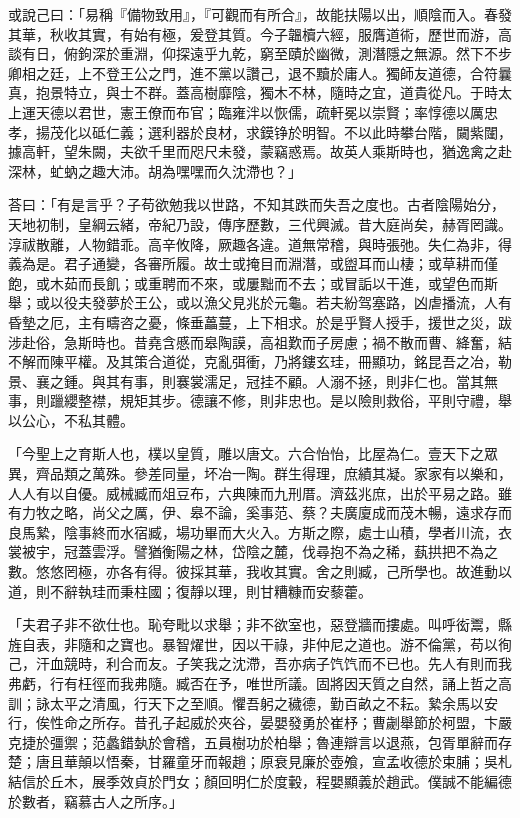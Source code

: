 \begin{pinyinscope}
或說己曰：「易稱『備物致用』，『可觀而有所合』，故能扶陽以出，順陰而入。春發其華，秋收其實，有始有極，爰登其質。今子韞櫝六經，服膺道術，歷世而游，高談有日，俯鉤深於重淵，仰探遠乎九乾，窮至賾於幽微，測潛隱之無源。然下不步卿相之廷，上不登王公之門，進不黨以讚己，退不黷於庸人。獨師友道德，合符曩真，抱景特立，與士不群。蓋高樹靡陰，獨木不林，隨時之宜，道貴從凡。于時太上運天德以君世，憲王僚而布官；臨雍泮以恢儒，疏軒冕以崇賢；率惇德以厲忠孝，揚茂化以砥仁義；選利器於良材，求鏌铮於明智。不以此時攀台階，闚紫闥，據高軒，望朱闕，夫欲千里而咫尺未發，蒙竊惑焉。故英人乘斯時也，猶逸禽之赴深林，虻蚋之趣大沛。胡為嘿嘿而久沈滯也？」

荅曰：「有是言乎？子苟欲勉我以世路，不知其跌而失吾之度也。古者陰陽始分，天地初制，皇綱云緒，帝紀乃設，傳序歷數，三代興滅。昔大庭尚矣，赫胥罔識。淳祓散離，人物錯乖。高辛攸降，厥趣各違。道無常稽，與時張弛。失仁為非，得義為是。君子通變，各審所履。故士或掩目而淵潛，或盥耳而山棲；或草耕而僅飽，或木茹而長飢；或重聘而不來，或屢黜而不去；或冒詬以干進，或望色而斯舉；或以役夫發夢於王公，或以漁父見兆於元龜。若夫紛驾塞路，凶虐播流，人有昏墊之厄，主有疇咨之憂，條垂藟蔓，上下相求。於是乎賢人授手，援世之災，跋涉赴俗，急斯時也。昔堯含慼而皋陶謨，高祖歎而子房慮；禍不散而曹、絳奮，結不解而陳平權。及其策合道從，克亂弭衝，乃將鏤玄珪，冊顯功，銘昆吾之冶，勒景、襄之鍾。與其有事，則褰裳濡足，冠挂不顧。人溺不拯，則非仁也。當其無事，則躐纓整襟，規矩其步。德讓不修，則非忠也。是以險則救俗，平則守禮，舉以公心，不私其體。

「今聖上之育斯人也，樸以皇質，雕以唐文。六合怡怡，比屋為仁。壹天下之眾異，齊品類之萬殊。參差同量，坏冶一陶。群生得理，庶績其凝。家家有以樂和，人人有以自優。威械臧而俎豆布，六典陳而九刑厝。濟茲兆庶，出於平易之路。雖有力牧之略，尚父之厲，伊、皋不論，奚事范、蔡？夫廣廈成而茂木暢，遠求存而良馬縶，陰事終而水宿臧，場功畢而大火入。方斯之際，處士山積，學者川流，衣裳被宇，冠蓋雲浮。譬猶衡陽之林，岱陰之麓，伐尋抱不為之稀，蓺拱把不為之數。悠悠罔極，亦各有得。彼採其華，我收其實。舍之則臧，己所學也。故進動以道，則不辭執珪而秉柱國；復靜以理，則甘糟糠而安藜藿。

「夫君子非不欲仕也。恥夸毗以求舉；非不欲室也，惡登牆而摟處。叫呼衒鬻，縣旌自表，非隨和之寶也。暴智燿世，因以干祿，非仲尼之道也。游不倫黨，苟以徇己，汗血競時，利合而友。子笑我之沈滯，吾亦病子饩饩而不已也。先人有則而我弗虧，行有枉徑而我弗隨。臧否在予，唯世所議。固將因天質之自然，誦上哲之高訓；詠太平之清風，行天下之至順。懼吾躬之穢德，勤百畝之不耘。縶余馬以安行，俟性命之所存。昔孔子起威於夾谷，晏嬰發勇於崔杼；曹劌舉節於柯盟，卞嚴克捷於彊禦；范蠡錯埶於會稽，五員樹功於柏舉；魯連辯言以退燕，包胥單辭而存楚；唐且華顛以悟秦，甘羅童牙而報趙；原衰見廉於壺飧，宣孟收德於束脯；吳札結信於丘木，展季效貞於門女；顏回明仁於度轂，程嬰顯義於趙武。僕誠不能編德於數者，竊慕古人之所序。」


\end{pinyinscope}
